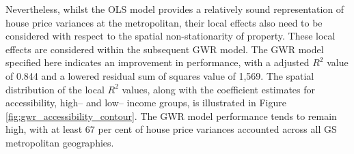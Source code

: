 Nevertheless, whilst the OLS model provides a relatively sound representation of house price variances at the metropolitan, their local effects also need to be considered with respect to the spatial non-stationarity of property. These local effects are considered within the subsequent GWR model. The GWR model specified here indicates an improvement in performance, with a adjusted $R^2$ value of 0.844 and a lowered residual sum of squares value of 1,569. The spatial distribution of the local $R^2$ values, along with the coefficient estimates for accessibility, high-- and low-- income groups, is illustrated in Figure \ref{fig:gwr_accessibility_contour}. The GWR model performance tends to remain high, with at least 67 per cent of house price variances accounted across all GS metropolitan geographies.

\renewcommand{\baselinestretch}{0.8}
